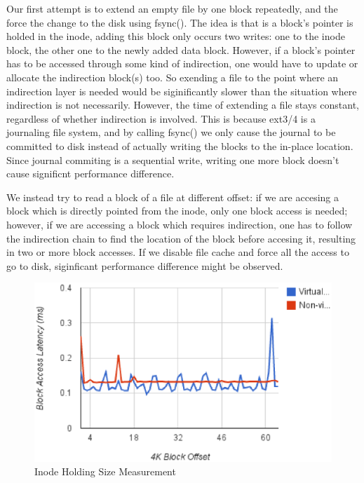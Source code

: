 Our first attempt is to extend an empty file by one block repeatedly, and the force the change to the disk using fsync(). The idea is that is a block's pointer is holded in the inode, adding this block only occurs two writes: one to the inode block, the other one to the newly added data block. However, if a block's pointer has to be accessed through some kind of indirection, one would have to update or allocate the indirection block(s) too. So exending a file to the point where an indirection layer is needed would be siginificantly slower than the situation where indirection is not necessarily. However, the time of extending a file stays constant, regardless of whether indirection is involved. This is because ext3/4 is a journaling file system, and by calling fsync() we only cause the journal to be committed to disk instead of actually writing the blocks to the in-place location. Since journal commiting is a sequential write, writing one more block doesn't cause significnt performance difference.

We instead try to read a block of a file at different offset: if we are accesing a block which is directly pointed from the inode, only one block access is needed; however, if we are accessing a block which requires indirection, one has to follow the indirection chain to find the location of the block before accesing it, resulting in two or more block accesses. If we disable file cache and force all the access to go to disk, siginficant performance difference might be observed. 

\begin{figure}
\centering
\includegraphics[width=.65\textwidth]{figures/indirect.eps}
\caption{Inode Holding Size Measurement}
\label{fig:indirect}
\end{figure}

